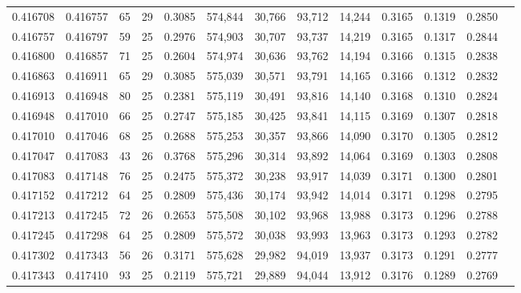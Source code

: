\begin{tabular}{rrrrrrrrrrrrr}
0.416708 & 0.416757 &    65 &  29 &                                     0.3085 & 574,844 &  30,766 &  93,712 &  14,244 & 0.3165 & 0.1319 & 0.2850 \\
0.416757 & 0.416797 &    59 &  25 &                                     0.2976 & 574,903 &  30,707 &  93,737 &  14,219 & 0.3165 & 0.1317 & 0.2844 \\
0.416800 & 0.416857 &    71 &  25 &                                     0.2604 & 574,974 &  30,636 &  93,762 &  14,194 & 0.3166 & 0.1315 & 0.2838 \\
0.416863 & 0.416911 &    65 &  29 &                                     0.3085 & 575,039 &  30,571 &  93,791 &  14,165 & 0.3166 & 0.1312 & 0.2832 \\
0.416913 & 0.416948 &    80 &  25 &                                     0.2381 & 575,119 &  30,491 &  93,816 &  14,140 & 0.3168 & 0.1310 & 0.2824 \\
0.416948 & 0.417010 &    66 &  25 &                                     0.2747 & 575,185 &  30,425 &  93,841 &  14,115 & 0.3169 & 0.1307 & 0.2818 \\
0.417010 & 0.417046 &    68 &  25 &                                     0.2688 & 575,253 &  30,357 &  93,866 &  14,090 & 0.3170 & 0.1305 & 0.2812 \\
0.417047 & 0.417083 &    43 &  26 &                                     0.3768 & 575,296 &  30,314 &  93,892 &  14,064 & 0.3169 & 0.1303 & 0.2808 \\
0.417083 & 0.417148 &    76 &  25 &                                     0.2475 & 575,372 &  30,238 &  93,917 &  14,039 & 0.3171 & 0.1300 & 0.2801 \\
0.417152 & 0.417212 &    64 &  25 &                                     0.2809 & 575,436 &  30,174 &  93,942 &  14,014 & 0.3171 & 0.1298 & 0.2795 \\
0.417213 & 0.417245 &    72 &  26 &                                     0.2653 & 575,508 &  30,102 &  93,968 &  13,988 & 0.3173 & 0.1296 & 0.2788 \\
0.417245 & 0.417298 &    64 &  25 &                                     0.2809 & 575,572 &  30,038 &  93,993 &  13,963 & 0.3173 & 0.1293 & 0.2782 \\
0.417302 & 0.417343 &    56 &  26 &                                     0.3171 & 575,628 &  29,982 &  94,019 &  13,937 & 0.3173 & 0.1291 & 0.2777 \\
0.417343 & 0.417410 &    93 &  25 &                                     0.2119 & 575,721 &  29,889 &  94,044 &  13,912 & 0.3176 & 0.1289 & 0.2769 \\

\end{tabular}
